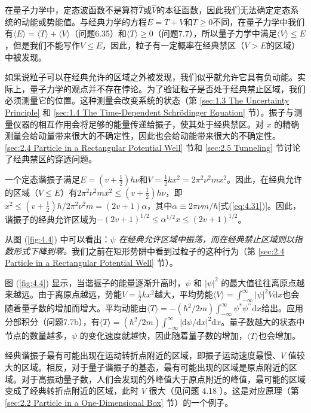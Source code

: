     在量子力学中，定态波函数不是算符$\hat{T}$或$\hat{V}$的本征函数，因此我们无法确定定态系统的动能或势能值。与经典力学的方程$E=T+V$和$T \ge 0$不同，在量子力学中我们有$\langle E \rangle = \langle T \rangle + \langle V \rangle$（问题6.35）和$\langle T \rangle \ge 0$（问题7.7），所以量子力学中满足$\langle V \rangle \le E$，但是我们不能写作$V \le E$，因此，粒子有一定概率在经典禁区（$V>E$的区域）中被发现。

    如果说粒子可以在经典允许的区域之外被发现，我们似乎就允许它具有负动能。实际上，量子力学的观点并不存在悖论。为了验证粒子是否处于经典禁止区域，我们必须测量它的位置。这种测量会改变系统的状态（第 \ref{sec:1.3 The Uncertainty Principle} 和 \ref{sec:1.4 The Time-Dependent Schrödinger Equation} 节）。振子与测量仪器的相互作用会将足够的能量传递给振子，使其处于经典禁区。对 $x$ 的精确测量会给动量带来很大的不确定性，因此也会给动能带来很大的不确定性。\ref{sec:2.4 Particle in a Rectangular Potential Well} 节和 \ref{sec:2.5 Tunneling} 节讨论了经典禁区的穿透问题。

    一个定态谐振子满足$E = \left(v+\frac{1}{2}\right)h\nu$和$V=\frac{1}{2}kx^2 = 2\pi^2\nu^2mx^2$。因此，在经典允许的区域（$V\le E$）有$2\pi^2\nu^2mx^2 \le \left(v+\frac{1}{2}\right)h\nu$，即$x^2 \le \left(v+\frac{1}{2}\right)h/2\pi^2\nu^2m = \left(2v+1\right)\alpha$，其中$\alpha \equiv 2\pi\nu m/\hbar$[式(\ref{eq:4.31})]。因此，谐振子的经典允许区域为$-\left(2v+1\right)^{1/2} \le \alpha^{1/2}x \le \left(2v+1\right)^{1/2}$。

    从图 (\ref{fig:4.4}) 中可以看出：\textit{$\psi$ 在经典允许区域中振荡，而在经典禁止区域则以指数形式下降到零。}我们之前在矩形势阱中看到过粒子的这种行为（第 \ref{sec:2.4 Particle in a Rectangular Potential Well} 节）。

    图 (\ref{fig:4.4}) 显示，当谐振子的能量逐渐升高时，$\psi$ 和 $\left|\psi\right|^2$ 的最大值往往离原点越来越远。由于离原点越远，势能$V = \frac{1}{2}kx^2$越大，平均势能$\langle V \rangle = \int_{-\infty}^{\infty}\left|\psi\right|^2V\mathrm{d}x$也会随着量子数的增加而增大。平均动能由$\langle T \rangle = -\left(\hbar^2/2m\right)\int_{-\infty}^{\infty}\psi^{\ast}\psi^{\prime\prime}\mathrm{d}x$给出。应用分部积分（问题7.7b），有$\langle T \rangle = \left(\hbar^2/2m\right)\int_{-\infty}^{\infty}\left|\mathrm{d}\psi/\mathrm{d}x\right|^2\mathrm{d}x$。量子数越大的状态中节点的数量越多，$\psi$ 的变化速度就越快，因此随着量子数的增加，$\langle T \rangle$也会增加。

    经典谐振子最有可能出现在运动转折点附近的区域，即振子运动速度最慢、$V$ 值较大的区域。相反，对于量子谐振子的基态，最有可能出现的区域是原点附近的区域。对于高振动量子数，人们会发现的外峰值大于原点附近的峰值，最可能的区域变成了经典转折点附近的区域，此时 $V$ 很大（见问题 4.18 ）。这是对应原理（第 \ref{sec:2.2 Particle in a One-Dimensional Box} 节）的一个例子。

